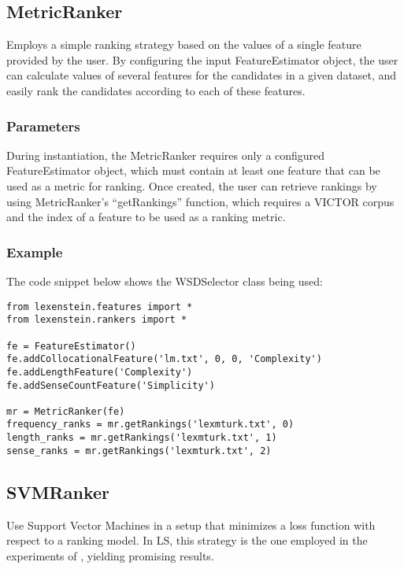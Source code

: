 \subsection{MetricRanker}

Employs a simple ranking strategy based on the values of a single feature provided by the user. By configuring the input FeatureEstimator object, the user can calculate values of several features for the candidates in a given dataset, and easily rank the candidates according to each of these features.

\subsubsection{Parameters}

During instantiation, the MetricRanker requires only a configured FeatureEstimator object, which must contain at least one feature that can be used as a metric for ranking. Once created, the user can retrieve rankings by using MetricRanker's ``getRankings'' function, which requires a VICTOR corpus and the index of a feature to be used as a ranking metric.

\subsubsection{Example}

The code snippet below shows the WSDSelector class being used:

\begin{lstlisting}
from lexenstein.features import *
from lexenstein.rankers import *

fe = FeatureEstimator()
fe.addCollocationalFeature('lm.txt', 0, 0, 'Complexity')
fe.addLengthFeature('Complexity')
fe.addSenseCountFeature('Simplicity')

mr = MetricRanker(fe)
frequency_ranks = mr.getRankings('lexmturk.txt', 0)
length_ranks = mr.getRankings('lexmturk.txt', 1)
sense_ranks = mr.getRankings('lexmturk.txt', 2)
\end{lstlisting}










\subsection{SVMRanker}

Use Support Vector Machines in a setup that minimizes a loss function with respect to a ranking model. In LS, this strategy is the one employed in the experiments of \cite{Horn2014}, yielding promising results.

